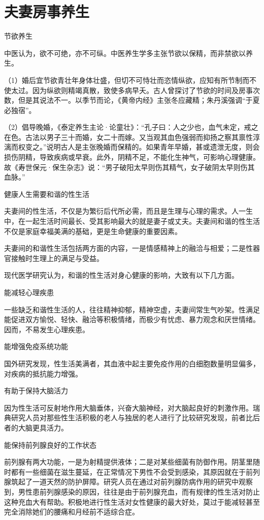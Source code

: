 \documentclass[12pt,UTF8,openany]{ctexbook}
\begin{document}
\chapter{夫妻房事养生}


节欲养生


中医认为，欲不可绝，亦不可纵。中医养生学多主张节欲以保精，而非禁欲以养生。

（1）婚后宜节欲青壮年身体壮盛，但切不可恃壮而恣情纵欲，应知有所节制而不使太过。因为纵欲则精竭真散，致使多病早夭。古人曾探讨了节欲的时间及房事次数，但是其说法不一。以季节而论，《黄帝内经》主张冬应藏精；朱丹溪强调“于夏必独宿”。

（2）倡导晚婚，《泰定养生主论·论童壮》：“孔子曰：人之少也，血气未定，戒之在色。古法以男子三十而婚，女二十而嫁。又当观其血色强弱而抑扬之察其禀性淳漓而权变之。”说明古人是主张晚婚而保精的。如果青年早婚，甚或遗泄无度，则会损伤阴精，导致疾病或早衰。此外，阴精不足，不能化生神气，可影响心理健康。故《寿世保元·保生杂志》说：“男子破阳太早则伤其精气，女子破阴太早则伤其血脉。”





健康人生需要和谐的性生活


夫妻间的性生活，不仅是为繁衍后代所必需，而且是生理与心理的需求。人一生中，在一起生活时间最长、受其影响最大的就是妻子或丈夫。夫妻间和谐的性生活不仅是家庭幸福美满的基础，更是生命健康的重要因素。

夫妻间的和谐性生活包括两方面的内容，一是情感精神上的融洽与相爱；二是性器官接触时生理上的满足与受益。

现代医学研究认为，和谐的性生活对身心健康的影响，大致有以下几方面。

能减轻心理疾患

一些缺乏和谐性生活的人，往往精神抑郁，精神空虚，夫妻间常生气吵架。性满足能促进双方愉悦、轻快、融洽等积极情绪，而极少有忧虑、暴力观念和厌世情绪。因而，不易发生心理疾患。

能增强免疫系统功能

国外研究发现，性生活美满者，其血液中起主要免疫作用的白细胞数量明显偏多，对疾病的抵抗能力增强。

有助于保持大脑活力

因为性生活可反射地作用大脑垂体，兴奋大脑神经，对大脑起良好的刺激作用。瑞典研究人员对那些性生活积极的老人与独居的老人进行了比较研究发现，前者比后者的大脑更具活力。

能保持前列腺良好的工作状态

前列腺有两大功能，一是为射精提供液体；二是对某些细菌有防御作用。阴茎里随时都有一些细菌在滋生蔓延，在正常情况下男性不会受到感染，其原因就在于前列腺筑起了一道天然的防护屏障。研究人员在通过对前列腺防病作用的研究中观察到，男性患前列腺感染的原因，往往是由于前列腺充血，而有规律的性生活对防止这种充血大有帮助。积极地进行性生活对女性健康的最大好处，莫过于能减轻甚至完全消除她们的腰痛和月经前不适综合症。
\end{document}

